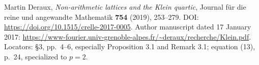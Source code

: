 Martin Deraux, \emph{Non-arithmetic lattices and the Klein quartic},
Journal f\"ur die reine und angewandte Mathematik \textbf{754} (2019),
253--279. DOI: \url{https://doi.org/10.1515/crelle-2017-0005}.
Author manuscript dated 17 January 2017:
\url{https://www-fourier.univ-grenoble-alpes.fr/~deraux/recherche/Klein.pdf}.
Locators: \S3, pp.~4--6, especially Proposition 3.1 and Remark 3.1;
equation (13), p.~24, specialized to \(p=2\).
